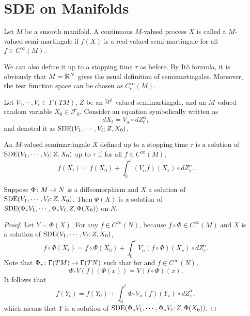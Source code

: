 \section{SDE on Manifolds}

\begin{defn}
    Let $M$ be a smooth manifold. A continuous $M$-valued process $X$ is called a $M$-valued semi-martingale if $f(X)$ is a real-valued semi-martingale for all $f \in C^\infty(M)$.
\end{defn}
\begin{rmk}
    We can also define it up to a stopping time $\tau$ as before. By It\^o formula, it is obviously that $M = \mathbb{R}^N$ gives the usual definition of semimartingales. Moreover, the test function space can be chosen as $C_c^\infty(M)$.
\end{rmk}

Let $V_1,\cdots,V_\ell \in \Gamma(TM)$, $Z$ be an $\mathbb{R}^\ell$-valued semimartingale, and an $M$-valued random variable $X_0 \in \mathcal{F}_0$. Consider an equation symbolically written as
\begin{equation*}
	dX_t = V_\alpha \circ dZ^\alpha_t,
\end{equation*}
and denoted it as $\operatorname{SDE}(V_1,\cdots,V_\ell;Z,X_0)$.

\begin{defn}
    An $M$-valued semimartingale $X$ defined up to a stopping time $\tau$ is a solution of $\operatorname{SDE}(V_1,\cdots,V_\ell;Z,X_0)$ up to $\tau$ if for all $f \in C^\infty(M)$,
    \begin{equation*}
    	f(X_t) = f(X_0) + \int_0^t(V_\alpha f)(X_s) \circ dZ_s^\alpha.
    \end{equation*}
\end{defn}

\begin{prop}
    Suppose $\Phi \colon M \rightarrow N$ is a diffeomorphism and $X$ a solution of $\operatorname{SDE}(V_1,\cdots,V_\ell;Z,X_0)$. Then $\Phi(X)$ is a solution of $\operatorname{SDE}(\Phi_* V_1,\cdots,\Phi_* V_\ell;Z,\Phi(X_0))$ on $N$.
\end{prop}
\begin{proof}
    Let $Y = \Phi(X)$. For any $f \in C^\infty(N)$, because $f \circ \Phi \in C^\infty(M)$ and $X$ is a solution of $\operatorname{SDE}(V_1,\cdots,V_\ell;Z,X_0)$,
    \begin{equation*}
    	f \circ \Phi(X_t) = f \circ \Phi(X_0) + \int_0^t V_\alpha (f \circ \Phi)(X_s) \circ dZ_s^\alpha.
    \end{equation*}
    Note that $\Phi_* \colon \Gamma(TM) \rightarrow \Gamma(TN)$ such that for and $f \in C^\infty(N)$,
    \begin{equation*}
    	\Phi_*V(f)(\Phi(x)) = V(f\circ \Phi)(x).
    \end{equation*}
    It follows that
    \begin{equation*}
    	f(Y_t) = f(Y_0) + \int_0^t \Phi_*V_\alpha (f)(Y_s) \circ dZ_s^\alpha,
    \end{equation*}
    which means that $Y$ is a solution of $\operatorname{SDE}(\Phi_* V_1,\cdots,\Phi_* V_\ell;Z,\Phi(X_0))$.
\end{proof}

